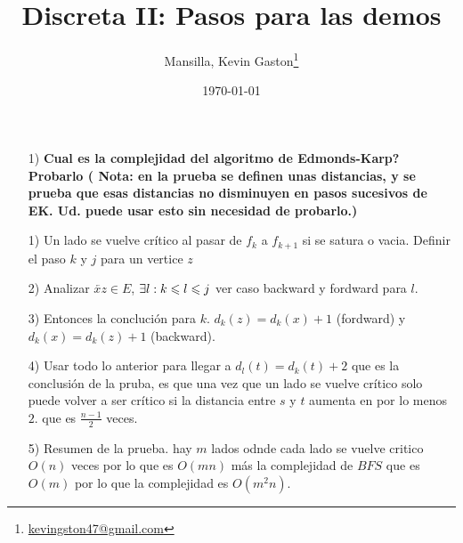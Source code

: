 \documentclass[12pt,a4paper]{article}
\author{Mansilla, Kevin Gaston\footnote{\href{mailto:kevingston47@gmail.com}{kevingston47@gmail.com}}}
\title{Discreta II: Pasos para las demos}
\date{\today}
\begin{document}
\maketitle{}

\begin{itemize}
    \item [1)] \textbf{Cual es la complejidad del algoritmo de Edmonds-Karp? Probarlo (
        Nota: en la prueba se definen unas distancias, y se prueba que esas 
        distancias no disminuyen en pasos sucesivos de EK. Ud. puede usar esto 
        sin necesidad de probarlo.)}
        \label{dem:EK}
\end{itemize}
\begin{itemize}
    \item [1)] Un lado se vuelve crítico al pasar de $f_{k}$ a $f_{k+1}$ si se 
        satura o vacia. Definir el paso $k$ y $j$ para un vertice $z$
    \item [2)] Analizar $\overleftarrow{xz} \in E$, $\exists l: k\leqslant l \leqslant j$
        ver caso backward y fordward para $l$.
    \item [3)] Entonces la conclución para $k$. $d_{k}(z) = d_{k}(x) + 1$ (fordward)
        y $d_{k}(x) = d_{k}(z) + 1$ (backward).
    \item [4)] Usar todo lo anterior para llegar a $d_{l}(t) = d_{k}(t) + 2$
        que es la conclusión de la pruba, es que una vez que un lado se vuelve 
        crítico solo puede volver a ser crítico si la distancia entre $s$ y $t$
        aumenta en por lo menos $2$. que es $\frac{n-1}{2}$ veces.
    \item [5)] Resumen de la prueba. hay $m$ lados odnde cada lado se vuelve 
        critico $O(n)$ veces por lo que es $O(mn)$ más la complejidad de $BFS$
        que es $O(m)$ por lo que la complejidad es $O(m^{2}n)$.
\end{itemize}
\end{document}
